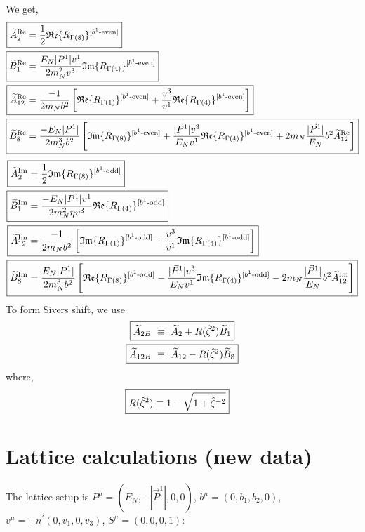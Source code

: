 \documentclass[]{article}
\numberwithin{equation}{section}
\newcommand{\tAmp}{\widetilde{A}}
\newcommand{\tBmp}{\widetilde{B}}
\newcommand{\tAmp}{\ensuremath{\widetilde{A}^{(+)}}}
\newcommand{\tBmp}{\ensuremath{\widetilde{B}^{(+)}}}
\newcommand{\bvec}{b}
\newcommand{\mN}{m_N}
\newcommand{\zetahat}{{\hat \zeta}}
\begin{document}
We get,
\begin{align}
    \Aboxed{\tAmp^{\text{Re}}_2 = & \frac{1}{2}\mathfrak{Re}\{ R_{\Gamma(8)}\}^{[b^{1}\text{-even}]} }\\
    \Aboxed{\tBmp^{\text{Re}}_1 = & \frac{E_{N}|P^1|v^1}{2\mN^2  v^3} \mathfrak{Im}\{ R_{\Gamma(4)}\}^{[b^{1}\text{-even}]}}\\
    \Aboxed{\tAmp^{\text{Re}}_{12}=&\frac{-1}{2\mN  \bvec^2}\left[\mathfrak{Re}\{ R_{\Gamma(1)}\}^{[b^{1}\text{-even}]}+\frac{v^3}{v^1}\mathfrak{Re}\{ R_{\Gamma(4)}\}^{[b^{1}\text{-even}]}\right]}\\
    \Aboxed{\tBmp^{\text{Re}}_8=&\frac{-E_N |P^1|}{ 2\mN^3 \bvec^2 }\left[\mathfrak{Im}\{ R_{\Gamma(8)}\}^{[b^{1}\text{-even}]}+\frac{|\vec{P}^1|v^3}{E_N v^1}\mathfrak{Re}\{ R_{\Gamma(4)}\}^{[b^{1}\text{-even}]}+ 2\mN  \frac{|\vec{P}^1|}{E_N} \bvec^2  \tAmp^{\text{Re}}_{12}\right]}
\end{align}
\begin{align}
    \Aboxed{\tAmp^{\text{Im}}_2 = & \frac{1}{2}\mathfrak{Im}\{ R_{\Gamma(8)}\}^{[b^{1}\text{-odd}]} }\\
    \Aboxed{\tBmp^{\text{Im}}_1 = & \frac{-E_{N}|P^1|v^1}{2\mN^2 \eta v^3} \mathfrak{Re}\{ R_{\Gamma(4)}\}^{[b^{1}\text{-odd}]}}\\
    \Aboxed{\tAmp^{\text{Im}}_{12}=&\frac{-1}{2\mN  \bvec^2}\left[\mathfrak{Im}\{ R_{\Gamma(1)}\}^{[b^{1}\text{-odd}]}+\frac{v^3}{v^1}\mathfrak{Im}\{ R_{\Gamma(4)}\}^{[b^{1}\text{-odd}]}\right]}\\
     \Aboxed{\tBmp^{\text{Im}}_8=&\frac{E_N|P^1|}{ 2\mN^3 \bvec^2  }\left[\mathfrak{Re}\{ R_{\Gamma(8)}\}^{[b^{1}\text{-odd}]}-\frac{|\vec{P}^1|v^3}{E_N v^1}\mathfrak{Im}\{ R_{\Gamma(4)}\}^{[b^{1}\text{-odd}]}- 2\mN  \frac{|\vec{P}^1|}{E_N} \bvec^2  \tAmp^{\text{Im}}_{12}\right]}
\end{align}
To form Sivers shift, we use
\begin{align}
    \Aboxed{\tAmp_{2B}  & \ \equiv\  \tAmp_2 + R(\zetahat^2) \tBmp_1}\\
    \Aboxed{\tAmp_{12B}  & \ \equiv\  \tAmp_{12} - R(\zetahat^2) \tBmp_8}
\end{align}
where,
\begin{align}
    \Aboxed{R(\zetahat^2) \equiv 1- \sqrt{1 + \hat \zeta^{-2}}}
\end{align}


\section{Lattice calculations (new data)}
The lattice setup is $P^{\mu}=(E_N, -|\vec{P}^1|,0,0)$, $b^{\mu}=(0,b_{1},b_{2},0)$, $v^{\mu}=\pm n^{\prime}(0,v_{1},0,v_{3})$, $S^{\mu}=(0,0,0,1)$:
\end{document}
